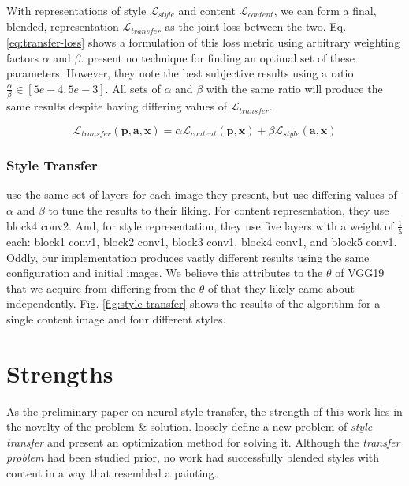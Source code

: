 \documentclass{article}
\begin{document}
With representations of style $\mathcal{L}_{style}$ and content
$\mathcal{L}_{content}$, we can form a final, blended, representation
$\mathcal{L}_{transfer}$ as the joint loss between the two. Eq.
\ref{eq:transfer-loss} shows a formulation of this loss metric using arbitrary
weighting factors $\alpha$ and $\beta$. \cite{2015arXiv150806576G} present no
technique for finding an optimal set of these parameters. However, they note
the best subjective results using a ratio $\frac{\alpha}{\beta} \in
[5e-4, 5e-3]$. All sets of $\alpha$ and $\beta$ with the same ratio will
produce the same results despite having differing values of
$\mathcal{L}_{transfer}$.

\begin{equation}
\label{eq:transfer-loss}
    \mathcal{L}_{transfer}(\mathbf{p}, \mathbf{a}, \mathbf{x}) =
    \alpha \mathcal{L}_{content}(\mathbf{p}, \mathbf{x}) +
    \beta \mathcal{L}_{style}(\mathbf{a}, \mathbf{x})
\end{equation}


\subsubsection{Style Transfer}

\cite{2015arXiv150806576G} use the same set of layers for each image they
present, but use differing values of $\alpha$ and $\beta$ to tune the results
to their liking. For content representation, they use block4 conv2. And, for
style representation, they use five layers with a weight of $\frac{1}{5}$
each: block1 conv1, block2 conv1, block3 conv1, block4 conv1, and block5
conv1. Oddly, our implementation produces vastly different results using the
same configuration and initial images. We believe this attributes to the
$\theta$ of VGG19 that we acquire from \cite{chollet2015keras} differing from
the $\theta$ of \cite{2015arXiv150806576G} that they likely came about
independently. Fig. \ref{fig:style-transfer} shows the results of the
algorithm for a single content image and four different styles.

\section{Strengths}

As the preliminary paper on neural style transfer, the strength of this work
lies in the novelty of the problem \& solution. \cite{2015arXiv150806576G}
loosely define a new problem of \textit{style transfer} and present an
optimization method for solving it. Although the \textit{transfer problem} had
been studied prior, no work had successfully blended styles with content in a
way that resembled a painting.
\end{document}
